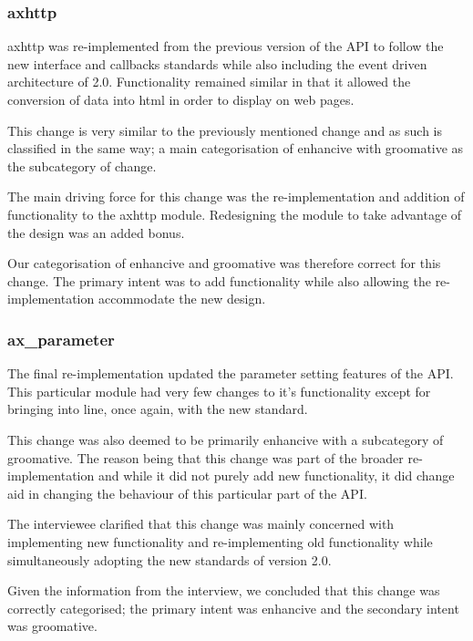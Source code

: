 \documentclass{sig-alternate}
\begin{document}
\subsubsection{axhttp}

axhttp was re-implemented from the previous version of the API to follow the new interface and callbacks standards while also including the event driven architecture of 2.0. Functionality remained similar in that it allowed the conversion of data into html in order to display on web pages. 

This change is very similar to the previously mentioned change and as such is classified in the same way; a main categorisation of enhancive with groomative as the subcategory of change.

The main driving force for this change was the re-implementation and addition of functionality to the axhttp module. Redesigning the module to take advantage of the design was an added bonus.

Our categorisation of enhancive and groomative was therefore correct for this change. The primary intent was to add functionality while also allowing the re-implementation accommodate the new design. 

\subsubsection{ax\_parameter}

The final re-implementation updated the parameter setting features of the API. This particular module had very few changes to it's functionality except for bringing into line, once again, with the new standard.

This change was also deemed to be primarily enhancive with a subcategory of groomative. The reason being that this change was part of the broader re-implementation and while it did not purely add new functionality, it did change aid in changing the behaviour of this particular part of the API.

The interviewee clarified that this change was mainly concerned with implementing new functionality and re-implementing old functionality while simultaneously adopting the new standards of version 2.0. 

Given the information from the interview, we concluded that this change was correctly categorised; the primary intent was enhancive and the secondary intent was groomative.
\end{document}
